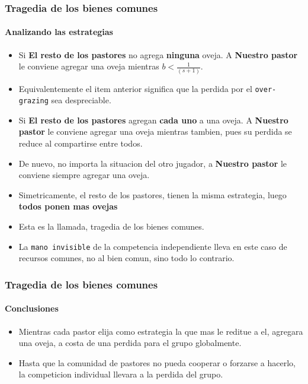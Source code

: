 \documentclass{beamer}
\begin{document}
\begin{frame}
  \frametitle{Tragedia de los bienes comunes}
  \framesubtitle{Analizando las estrategias}
  \begin{itemize}
    \setlength{\itemsep}{2pt}    
    \item Si \textbf{El resto de los pastores} no agrega \textbf{ninguna} oveja. A \textbf{Nuestro pastor} le conviene agregar una oveja mientras $b < \frac{1}{(s+1)}$.
    \pause
    \item Equivalentemente el item anterior significa que la perdida por el \texttt{over-grazing} sea despreciable.
    \pause 
    \item Si \textbf{El resto de los pastores} agregan \textbf{cada uno} a una oveja. A \textbf{Nuestro pastor} le conviene agregar una oveja mientras tambien, pues su perdida se reduce al compartirse entre todos.
    \pause
    \item De nuevo, no importa la situacion del otro jugador, a \textbf{Nuestro pastor} le conviene siempre agregar una oveja.
    \pause
    \item Simetricamente, el resto de los pastores, tienen la misma estrategia, luego \textbf{todos ponen mas ovejas}
    \pause
    \item Esta es la llamada, tragedia de los bienes comunes.
    \pause
    \item La \texttt{mano invisible} de la competencia independiente lleva en este caso de recursos comunes, no al bien comun, sino todo lo contrario.
  \end{itemize}
\end{frame}

\begin{frame}
  \frametitle{Tragedia de los bienes comunes}
  \framesubtitle{Conclusiones}
  \begin{itemize}
    \setlength{\itemsep}{5pt}    
    \item Mientras cada pastor elija como estrategia la que mas le reditue a el, agregara una oveja, a costa de una perdida para el grupo globalmente.
    \pause
    \item Hasta que la comunidad de pastores no pueda cooperar o forzarse a hacerlo, la competicion individual llevara a la perdida del grupo.
  \end{itemize}
\end{frame}
\end{document}
